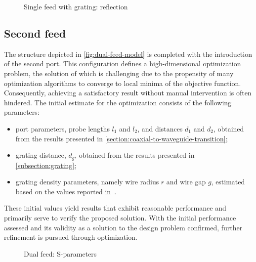 \documentclass[14pt,a4paper]{ntust_report}
\begin{document}
\begin{figure}[!ht]
    \centering
    
    \caption{\label{fig:single-feed-with-grating-reflection}Single feed with grating: reflection}
\end{figure}

\subsection{Second feed}
\label{subsection:dual-feed-optimization}
The structure depicted in \cref{fig:dual-feed-model} is completed with the introduction of the second port. This configuration defines a high-dimensional optimization problem, the solution of which is challenging due to the propensity of many optimization algorithms to converge to local minima of the objective function. Consequently, achieving a satisfactory result without manual intervention is often hindered. The initial estimate for the optimization consists of the following parameters:
\begin{itemize}
    \item port parameters, probe lengths $l_1$ and $l_2$, and distances $d_1$ and $d_2$, obtained from the results presented in \cref{section:coaxial-to-waveguide-transition};
    \item grating distance, $d_g$, obtained from the results presented in \cref{subsection:grating};
    \item grating density parameters, namely wire radius $r$ and wire gap $g$, estimated based on the values reported in~\parencite{karki-et-al:dual-polarized-probe-for-planar-near-field-measurement}.
\end{itemize}
These initial values yield results that exhibit reasonable performance and primarily serve to verify the proposed solution. With the initial performance assessed and its validity as a solution to the design problem confirmed, further refinement is pursued through optimization.

\begin{figure}[!ht]
    \centering
    
    \caption{\label{fig:dual-feed-sparameters}Dual feed: S-parameters}
\end{figure}
\end{document}
